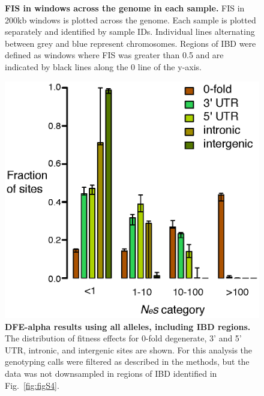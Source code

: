 \begin{figure}[ht!]
    \caption{\textbf{FIS in windows across the genome in each sample.} FIS in 200kb windows is plotted across the genome. Each sample is plotted separately and identified by sample IDs. Individual lines alternating between grey and blue represent chromosomes. Regions of IBD were defined as windows where FIS was greater than 0.5 and are indicated by black lines along the 0 line of the y-axis.}
    \label{fig:figS5}
\end{figure}

\begin{figure}[ht!]
      \centering
       \includegraphics[width=\linewidth]{Ch2FigS6}
    \caption{\textbf{DFE-alpha results using all alleles, including IBD regions.} The distribution of fitness effects for 0-fold degenerate, 3’ and 5’ UTR, intronic, and intergenic sites are shown. For this analysis the genotyping calls were filtered as described in the methods, but the data was not downsampled in regions of IBD identified in Fig.~\ref{fig:figS4}.}
    \label{fig:figS6}
\end{figure}


